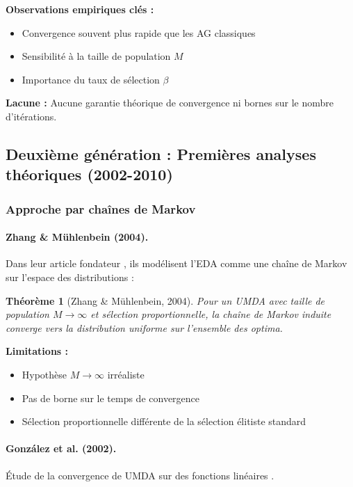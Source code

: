 \documentclass[12pt,a4paper]{article}
\newtheorem{theorem}{Théorème}[section]
\theoremstyle{definition}
\theoremstyle{remark}
\begin{document}
\textbf{Observations empiriques clés :}
\begin{itemize}
    \item Convergence souvent plus rapide que les AG classiques
    \item Sensibilité à la taille de population $M$
    \item Importance du taux de sélection $\beta$
\end{itemize}

\textbf{Lacune :} Aucune garantie théorique de convergence ni bornes sur le nombre d'itérations.

\subsection{Deuxième génération : Premières analyses théoriques (2002-2010)}

\subsubsection{Approche par chaînes de Markov}

\paragraph{Zhang \& Mühlenbein (2004).}
Dans leur article fondateur \cite{zhang2004convergence}, ils modélisent l'EDA comme une chaîne de Markov sur l'espace des distributions :

\begin{theorem}[Zhang \& Mühlenbein, 2004]
Pour un UMDA avec taille de population $M \to \infty$ et sélection proportionnelle, la chaîne de Markov induite converge vers la distribution uniforme sur l'ensemble des optima.
\end{theorem}

\textbf{Limitations :}
\begin{itemize}
    \item Hypothèse $M \to \infty$ irréaliste
    \item Pas de borne sur le temps de convergence
    \item Sélection proportionnelle différente de la sélection élitiste standard
\end{itemize}

\paragraph{González et al. (2002).}
Étude de la convergence de UMDA sur des fonctions linéaires \cite{gonzalez2002convergence}.
\end{document}
